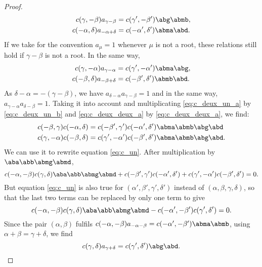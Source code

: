 \begin{proof}
\begin{subequations}
\begin{align}
c(\gamma,-\beta)a_{\gamma-\beta}&=c(\gamma',-\beta')\abg\abmb,  \label{eq:c_deux_un_a}\\
c(-\alpha,\delta)a_{-\alpha+\delta}&=c(-\alpha',\delta')\abma\abd.\label{eq:c_deux_un_b}
\end{align}
\end{subequations}
If we take for the convention $a_{\mu}=1$ whenever $\mu$ is not a root, these relations still hold if $\gamma-\beta$ is not a root. In the same way,
\begin{subequations}\label{eq:c_deux_deux}
\begin{align}
c(\gamma,-\alpha)a_{\gamma-\alpha}&=c(\gamma',-\alpha')\abma\abg,\label{eq:c_deux_deux_a}\\
c(-\beta,\delta)a_{-\beta+\delta}&=c(-\beta',\delta')\abmb\abd.\label{eq:c_deux_deux_b}
\end{align}
\end{subequations}
As $\delta-\alpha=-(\gamma-\beta)$, we have $a_{\delta-\alpha}a_{\gamma-\beta}=1$ and in the same way, $a_{\gamma-\alpha}a_{\delta-\beta}=1$. Taking it into account and multiplicating \eqref{eq:c_deux_un_a} by \eqref{eq:c_deux_un_b} and \eqref{eq:c_deux_deux_a} by \eqref{eq:c_deux_deux_a}, we find:
\begin{subequations}\label{eq:c_deux_trois}
\begin{align}
c(-\beta,\gamma)c(-\alpha,\delta)&=c(-\beta',\gamma')c(-\alpha',\delta')\abma\abmb\abg\abd\label{eq:c_deux_trois_a}\\
c(\gamma,-\alpha)c(-\beta,\delta)&=c(\gamma',-\alpha')c(-\beta',\delta')\abma\abmb\abg\abd.
\end{align}
\end{subequations}
We can use it to rewrite equation \eqref{eq:c_un}. After multiplication by $\aba\abb\abmg\abmd$,
\begin{equation}
c(-\alpha,-\beta)c(\gamma,\delta)\aba\abb\abmg\abmd+c(-\beta',\gamma')c(-\alpha',\delta')+c(\gamma',-\alpha')c(-\beta',\delta')=0.
\end{equation}
But equation \eqref{eq:c_un} is also true for $(\alpha',\beta',\gamma',\delta')$ instead of $(\alpha,\beta,\gamma,\delta)$, so that the last two terms can be replaced by only one term to give
\[
c(-\alpha,-\beta)c(\gamma,\delta)\aba\abb\abmg\abmd-c(-\alpha',-\beta')c(\gamma',\delta')=0.
\]
Since the pair $(\alpha,\beta)$ fulfils $c(-\alpha,-\beta)a_{-\alpha-\beta}=c(-\alpha',-\beta')\abma\abmb$, using $\alpha+\beta=\gamma+\delta$, we find
\[
c(\gamma,\delta)a_{\gamma+\delta}=c(\gamma',\delta')\abg\abd.
\]

\end{proof}


